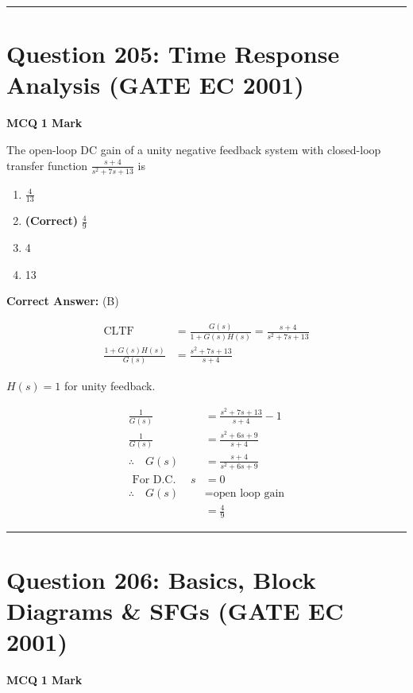 \documentclass[11pt,a4paper]{article}
\begin{document}
\vspace{1.5em}
\hrule
\vspace{1.5em}

\section*{Question 205: Time Response Analysis (GATE EC 2001)}
\noindent \textbf{\color{primary}MCQ} \hfill \textbf{\color{secondary}1 Mark}


\noindent The open-loop DC gain of a unity negative feedback system with closed-loop
transfer function $\frac{s+4}{s^{2}+7s+13}$ is


\begin{enumerate}[label=(\Alph*)]
    \item $\frac{4}{13}$
    \item \textbf{(Correct)} $\frac{4}{9}$
    \item 4
    \item 13
\end{enumerate}

\noindent \textbf{Correct Answer:} (B)

\begin{tcolorbox}[solbox, title=Detailed Solution -- Question 205]
\[
\begin{aligned} \mathrm{CLTF} &=\frac{G(s)}{1+G(s) H(s)}=\frac{s+4}{s^{2}+7 s+13} \\ \frac{1+G(s) H(s)}{G(s)} &=\frac{s^{2}+7 s+13}{s+4} \end{aligned}
\]

$H(s)=1$ for unity feedback.

\[
\begin{aligned} \frac{1}{G(s)} &=\frac{s^{2}+7 s+13}{s+4}-1 \\ \frac{1}{G(s)} &=\frac{s^{2}+6 s+9}{s+4} \\ \therefore \quad G(s) &=\frac{s+4}{s^{2}+6 s+9} \\ \text { For D.C. } \quad s&=0\\ \therefore \quad G(s) &=\text{open loop gain} \\ &=\frac{4}{9} \end{aligned}
\]
\end{tcolorbox}

\vspace{1.5em}
\hrule
\vspace{1.5em}

\section*{Question 206: Basics, Block Diagrams \& SFGs (GATE EC 2001)}
\noindent \textbf{\color{primary}MCQ} \hfill \textbf{\color{secondary}1 Mark}
\end{document}
